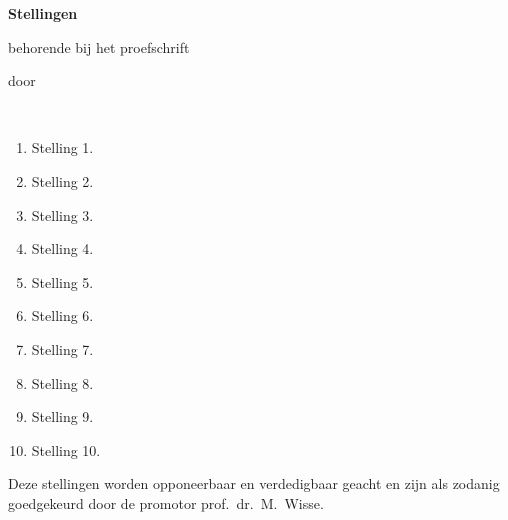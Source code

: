 \documentclass[nativefonts]{TUD-dissertation2020}
\begin{document}
\clearpage
{

\begin{center}

{\Large\titlefont\bfseries Stellingen}

\bigskip

behorende bij het proefschrift

\bigskip

{\makeatletter
\titlestyle\bfseries\large\@title
\makeatother}

{\makeatletter
\ifx\@subtitle\undefined\else
    \titlefont\titleshape\@subtitle
\fi
\makeatother}

\bigskip

door

\bigskip

\makeatletter
{\large\titlefont\bfseries\@firstname\ {\titleshape\@lastname}}
\makeatother

\end{center}

\bigskip
\bigskip

\begin{enumerate}

\item Stelling 1.
\item Stelling 2.
\item Stelling 3.
\item Stelling 4.
\item Stelling 5.
\item Stelling 6.
\item Stelling 7.
\item Stelling 8.
\item Stelling 9.
\item Stelling 10.

\end{enumerate}

\bigskip
\bigskip

\begin{center}
Deze stellingen worden opponeerbaar en verdedigbaar geacht en zijn als zodanig goedgekeurd door de promotor prof.\ dr.\ M.\ Wisse.
\end{center}

}
\end{document}
